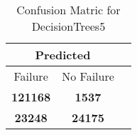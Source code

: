 \begin{table}[] 
\caption{Confusion Matric for DecisionTrees5} 
\label{Table: Prediction Accuracy-DMDDecisionTrees5OnlySunEKF-combinationReflectionEKF-top2perfectNoFailurePrediction-Reflection} 
\centering 
\begin{tabular} 
 {@{}ccc@{}} 
\toprule 
\multicolumn{2}{c}{\textbf{Predicted}}
 \\ \midrule 
\multicolumn{1}{|c|}{Failure} & 
\multicolumn{1}{c|}{No Failure}
 \\ \midrule 
\multicolumn{1}{|c|}{\color{green}\textbf{121168}} & 
\multicolumn{1}{c|}{\color{red}\textbf{1537}}
 \\ \midrule 
\multicolumn{1}{|c|}{\color{red}\textbf{23248}} & 
\multicolumn{1}{c|}{\color{green}\textbf{24175}}
 \\ \bottomrule 
\end{tabular} 
\end{table} 
